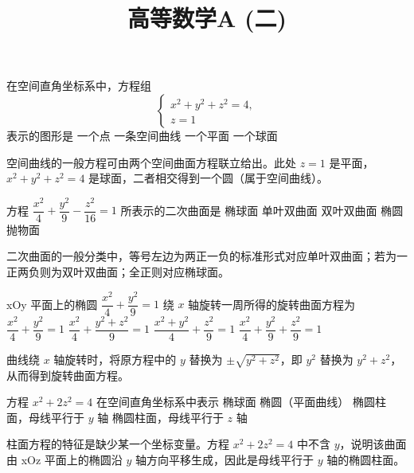 \documentclass[answer]{THUExam}
\title{高等数学A (二)}
\author{}
\begin{document}
\vspace{1cm}
\makehead

\vspace{1cm}


\begin{problem}
在空间直角坐标系中，方程组
\[
\begin{cases}
x^2+y^2+z^2=4,\\
z=1
\end{cases}
\]
表示的图形是
\options
{一个点}
{一条空间曲线}
{一个平面}
{一个球面}
\end{problem}
\begin{note}
空间曲线的一般方程可由两个空间曲面方程联立给出。此处 $z=1$ 是平面，$x^2+y^2+z^2=4$ 是球面，二者相交得到一个圆（属于空间曲线）。
\end{note}
\bigskip

\begin{problem}
方程 $\dfrac{x^2}{4}+\dfrac{y^2}{9}-\dfrac{z^2}{16}=1$ 所表示的二次曲面是
\options
{椭球面}
{单叶双曲面}
{双叶双曲面}
{椭圆抛物面}
\end{problem}
\begin{note}
二次曲面的一般分类中，等号左边为两正一负的标准形式对应单叶双曲面；若为一正两负则为双叶双曲面；全正则对应椭球面。
\end{note}
\bigskip

\begin{problem}
xOy 平面上的椭圆 $\dfrac{x^2}{4}+\dfrac{y^2}{9}=1$ 绕 $x$ 轴旋转一周所得的旋转曲面方程为
\options
{$\dfrac{x^2}{4}+\dfrac{y^2}{9}=1$}
{$\dfrac{x^2}{4}+\dfrac{y^2+z^2}{9}=1$}
{$\dfrac{x^2+y^2}{4}+\dfrac{z^2}{9}=1$}
{$\dfrac{x^2}{4}+\dfrac{y^2}{9}+\dfrac{z^2}{9}=1$}
\end{problem}
\begin{note}
曲线绕 $x$ 轴旋转时，将原方程中的 $y$ 替换为 $\pm\sqrt{y^2+z^2}$，即 $y^2$ 替换为 $y^2+z^2$，从而得到旋转曲面方程。
\end{note}
\bigskip

\begin{problem}
方程 $x^2+2z^2=4$ 在空间直角坐标系中表示
\options
{椭球面}
{椭圆（平面曲线）}
{椭圆柱面，母线平行于 $y$ 轴}
{椭圆柱面，母线平行于 $z$ 轴}
\end{problem}
\begin{note}
柱面方程的特征是缺少某一个坐标变量。方程 $x^2+2z^2=4$ 中不含 $y$，说明该曲面由 xOz 平面上的椭圆沿 $y$ 轴方向平移生成，因此是母线平行于 $y$ 轴的椭圆柱面。
\end{note}
\bigskip
\end{document}
